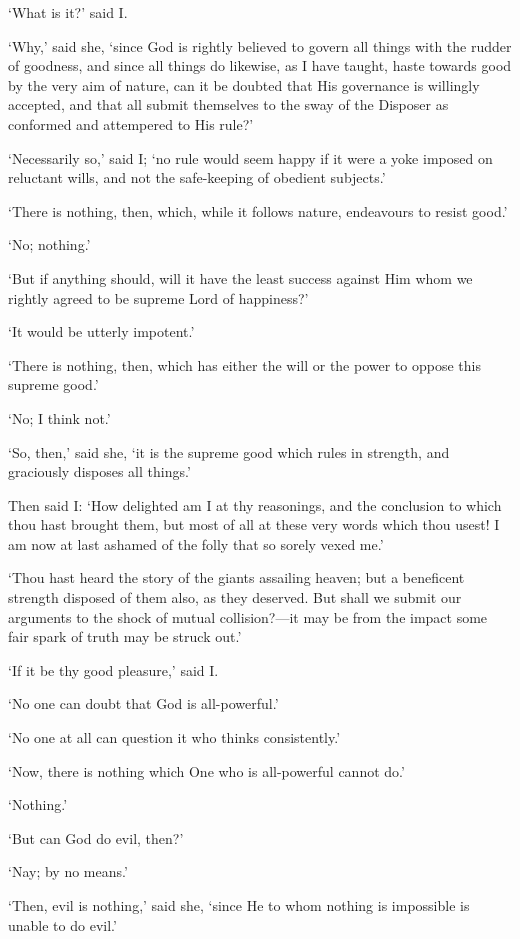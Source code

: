 \documentclass[12pt]{book}
\begin{document}
`What is it?' said I.

`Why,' said she, `since God is rightly believed to govern all things
with the rudder of goodness, and since all things do likewise, as I have
taught, haste towards good by the very aim of nature, can it be doubted
that His governance is willingly accepted, and that all submit
themselves to the sway of the Disposer as conformed and attempered to
His rule?'

`Necessarily so,' said I; `no rule would seem happy if it were a yoke
imposed on reluctant wills, and not the safe-keeping of obedient
subjects.'

`There is nothing, then, which, while it follows nature, endeavours to
resist good.'

`No; nothing.'

`But if anything should, will it have the least success against Him whom
we rightly agreed to be supreme Lord of happiness?'

`It would be utterly impotent.'

`There is nothing, then, which has either the will or the power to
oppose this supreme good.'

`No; I think not.'

`So, then,' said she, `it is the supreme good which rules in strength,
and graciously disposes all things.'

Then said I: `How delighted am I at thy reasonings, and the conclusion
to which thou hast brought them, but most of all at these very words
which thou usest! I am now at last ashamed of the folly that so sorely
vexed me.'

`Thou hast heard the story of the giants assailing heaven; but a
beneficent strength disposed of them also, as they deserved. But shall
we submit our arguments to the shock of mutual collision?---it may be
from the impact some fair spark of truth may be struck out.'

`If it be thy good pleasure,' said I.

`No one can doubt that God is all-powerful.'

`No one at all can question it who thinks consistently.'

`Now, there is nothing which One who is all-powerful cannot do.'

`Nothing.'

`But can God do evil, then?'

`Nay; by no means.'

`Then, evil is nothing,' said she, `since He to whom nothing is
impossible is unable to do evil.'
\end{document}

